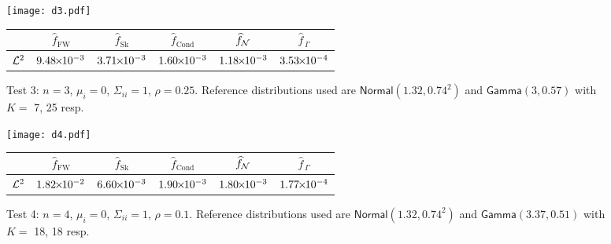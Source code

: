 

\begin{figure}[H]
\centering
\texttt{[image: d3.pdf]}

\vspace{4mm}

\begin{tabular}{c|c|c|c|c|c|}
\cline{2-6}
                         & $\widehat{f}_{\mathrm{FW}}$  & $\widehat{f}_{\mathrm{Sk}}$ & $\widehat{f}_{\mathrm{Cond}}$ & $\widehat{f}_{\mathcal{N}}$  & $\widehat{f}_{\,\Gamma}$ \\ \hline
\multicolumn{1}{|c|}{$\mathcal{L}^2$} & $9.48 {\mkern-2mu\times\mkern-2mu} 10^{-3}$ & $3.71 {\mkern-2mu\times\mkern-2mu} 10^{-3}$ & $1.60 {\mkern-2mu\times\mkern-2mu} 10^{-3}$ & $1.18 {\mkern-2mu\times\mkern-2mu} 10^{-3}$ & $3.53 {\mkern-2mu\times\mkern-2mu} 10^{-4}$ \\ \hline
\end{tabular}
\caption*{Test 3: $n=3$, $\mu_i = 0$, $\Sigma_{ii} = 1$, $\rho = 0.25$. Reference distributions used are $\mathsf{Normal}(1.32,0.74^2)$ and $\mathsf{Gamma}(3,0.57)$ with $K =$ 7, 25 resp.}
\end{figure}



\begin{figure}[H]
\centering
\texttt{[image: d4.pdf]}

\vspace{4mm}

\begin{tabular}{c|c|c|c|c|c|}
\cline{2-6}
                         & $\widehat{f}_{\mathrm{FW}}$  & $\widehat{f}_{\mathrm{Sk}}$ & $\widehat{f}_{\mathrm{Cond}}$ & $\widehat{f}_{\mathcal{N}}$  & $\widehat{f}_{\,\Gamma}$ \\ \hline
\multicolumn{1}{|c|}{$\mathcal{L}^2$} & $1.82 {\mkern-2mu\times\mkern-2mu} 10^{-2}$ & $6.60 {\mkern-2mu\times\mkern-2mu} 10^{-3}$ & $1.90 {\mkern-2mu\times\mkern-2mu} 10^{-3}$ & $1.80 {\mkern-2mu\times\mkern-2mu} 10^{-3}$ & $1.77 {\mkern-2mu\times\mkern-2mu} 10^{-4}$ \\ \hline
\end{tabular}
\caption*{Test 4: $n=4$, $\mu_i = 0$, $\Sigma_{ii}=1$, $\rho = 0.1$. Reference distributions used are $\mathsf{Normal}(1.32,0.74^2)$ and $\mathsf{Gamma}(3.37,0.51)$ with $K =$ 18, 18 resp.}
\end{figure}

